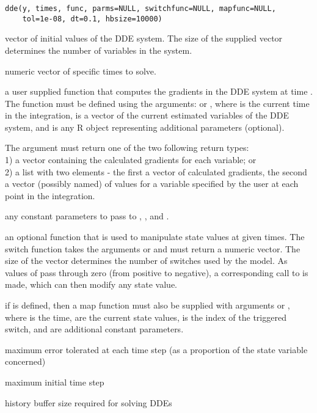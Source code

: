 \documentclass[letterpaper]{book}
\begin{document}
%
\begin{Usage}
\begin{verbatim}
dde(y, times, func, parms=NULL, switchfunc=NULL, mapfunc=NULL, 
    tol=1e-08, dt=0.1, hbsize=10000) 
\end{verbatim}
\end{Usage}
%
\begin{Arguments}
\begin{ldescription}
\item[\code{y}] vector of initial values of the DDE system. The size of the supplied vector
determines the number of variables in the system.
\item[\code{times}] numeric vector of specific times to solve. 
\item[\code{func}] a user supplied function that computes the gradients in the DDE 
system at time . The function must be defined using the arguments: 
 or , where  is the current time
in the integration,  is a vector of the current estimated variables 
of the DDE system, and  is any R object representing 
additional parameters (optional). 

The argument  must return one of the two following return types: \\{}
1) a vector containing the calculated gradients for each variable; or \\{}
2) a list with two elements - the first a vector of calculated gradients, 
the second a vector (possibly named) of values for a variable specified by 
the user at each point in the integration.

\item[\code{parms}] any constant parameters to pass to , , 
and .

\item[\code{switchfunc}] an optional function that is used to manipulate state 
values at given times. The switch function takes the arguments  or 
 and must return a numeric vector. The size of the vector 
determines the number of switches used by the model. As values of 
 pass through zero (from positive to negative), a corresponding 
call to  is made, which can then modify any state value.

\item[\code{mapfunc}] if  is defined, then a map function must also 
be supplied with arguments  or ,
where  is the time,  are the current state values,  
is the index of the triggered switch, and  are additional constant parameters.

\item[\code{tol}] maximum error tolerated at each time step (as a proportion of 
the state variable concerned)

\item[\code{dt}] maximum initial time step
\item[\code{hbsize}] history buffer size required for solving DDEs
\end{ldescription}
\end{Arguments}
\end{document}
